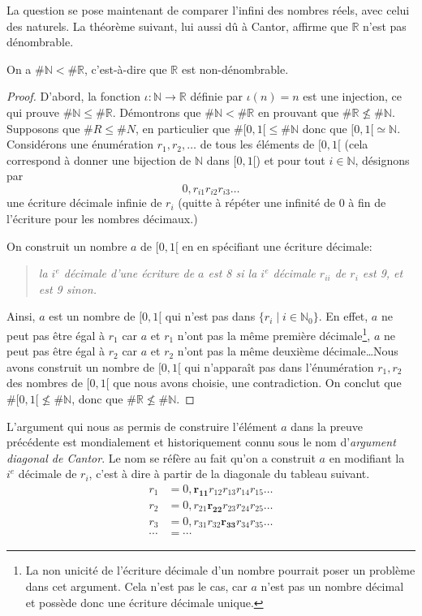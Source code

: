 \documentclass[french,course,oneside,theoremnosection]{lecture}
\newcommand{\R}{\mathbb{R}}
\newcommand{\N}{\mathbb{N}}
\begin{document}
La question se pose maintenant de comparer l'infini des nombres réels, avec celui des naturels. La théorème suivant, lui aussi dû à Cantor, affirme que $\R$ n'est pas dénombrable. 
\begin{theorem}
On a $\#\N < \#\R$, c'est-à-dire que $\R$ est non-dénombrable. 
\end{theorem}
\begin{proof}
D'abord, la fonction $\iota\colon \N \to \R$ définie par $\iota(n)=n$ est une injection, ce qui prouve $\# \N \leq \# \R$. Démontrons que $\#\N < \# \R$ en prouvant que $\#\R \not\leq \#\N$. Supposons que $\#R \leq \#N$, en particulier que $\#[0,1[\leq \#\N$ donc que $[0,1[\simeq \N$. Considérons une énumération $r_1,r _2, \ldots$ de tous les éléments de $[0,1[$ (cela correspond à donner une bijection de $\N$ dans $[0,1[$) et pour tout $i \in \N$, désignons par \[0,r_{i1}r_{i2}r_{i3}\ldots\] une écriture décimale infinie de $r_i$ (quitte à répéter une infinité de 0 à fin de l'écriture pour les nombres décimaux.)

On construit un nombre $a$ de $[0,1[$ en en spécifiant une écriture décimale:
\begin{quotation}\emph{
la $i^{e}$ décimale d'une écriture  de $a$ est 8 si la $i^{e}$ décimale $r_{ii}$ de $r_i$ est 9, et est 9 sinon. }
\end{quotation}
Ainsi, $a$ est un nombre de $[0,1[$ qui n'est pas dans $\{r_i \mid i \in \N_0\}$. En effet, $a$ ne peut pas être égal à $r_1$ car $a$ et $r_1$ n'ont pas la même première décimale\footnote{La non unicité de l'écriture décimale d'un nombre pourrait poser un problème dans cet argument. Cela n'est pas le cas, car $a$ n'est pas un nombre décimal et possède donc une écriture décimale unique.}, $a$ ne peut pas être égal à $r_2$ car $a$ et $r_2$ n'ont pas la même deuxième décimale\ldots  Nous avons construit un nombre de $[0,1[$ qui n'apparaît pas dans l'énumération $r_1, r_2$ des nombres de $[0,1[$ que nous avons choisie, une contradiction. On conclut que $\#[0,1[\not\leq \#\N$, donc que $\#\R \not\leq \#\N$.
\end{proof}
\begin{remark}
L'argument qui nous as permis de construire l'élément $a$ dans la preuve précédente est mondialement et historiquement connu sous le nom d'\emph{argument diagonal de Cantor}. Le nom se réfère au fait qu'on a construit $a$ en modifiant la $i^e$ décimale de $r_i$, c'est à dire à partir de la diagonale du tableau suivant.
 \begin{align*}
 r_1 &=0,\mathbf{r_{11}}r_{12}r_{13}r_{14}r_{15}\ldots\\
 r_2 &=0,r_{21}\mathbf{r_{22}}r_{23}r_{24}r_{25}\ldots\\
 r_3 &=0,r_{31}r_{32}\mathbf{r_{33}}r_{34}r_{35}\ldots\\
 \cdots & = \cdots
 \end{align*}
\end{remark}
\end{document}
